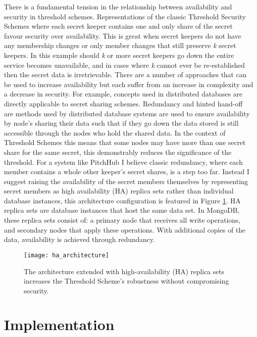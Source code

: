 There is a fundamental tension in the relationship between availability and security in threshold schemes. Representations of the classic Threshold Security Schemes where each secret keeper contains one and only share of the secret favour security over availability. This is great when secret keepers do not have any membership changes or only member changes that still preserve \textit{k} secret keepers. In this example should \textit{k} or more secret keepers go down the entire service becomes unavailable, and in cases where \textit{k} cannot ever be re-established then the secret data is irretrievable. There are a number of approaches that can be used to increase availability but each suffer from an increase in complexity and a decrease in security. For example, concepts used in distributed databases are directly applicable to secret sharing schemes. Redundancy and hinted hand-off are methods used by distributed database systems are used to ensure availability by node's sharing their data such that if they go down the data stored is still accessible through the nodes who hold the shared data. In the context of Threshold Schemes this means that some nodes may have more than one secret share for the same secret, this demonstrably reduces the significance of the threshold. For a system like PitchHub I believe classic redundancy, where each member contains a whole other keeper's secret shares, is a step too far. Instead I suggest raising the availability of the secret members themselves by representing secret members as high availability (HA) replica sets rather than individual database instances, this architecture configuration is featured in Figure \ref{fig:architecture_high_availability}. HA replica sets are database instances that host the same data set. In MongoDB, these replica sets consist of: a primary node that receives all write operations, and secondary nodes that apply these operations. With additional copies of the data, availability is achieved through redundancy.

\begin{figure}[ht]
    \centering
    \texttt{[image: ha\_architecture]}
    \caption{The architecture extended with high-availability (HA) replica sets increases the Threshold Scheme's robustness without compromising security.}
    \label{fig:architecture_high_availability}
\end{figure}

\section{Implementation}

